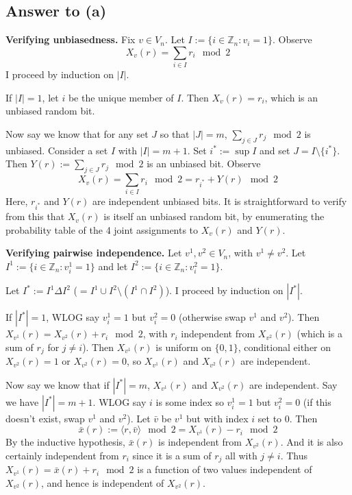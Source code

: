 \documentclass{article}
\begin{document}
\subsection*{Answer to (a)}

\textbf{Verifying unbiasedness.}
Fix $v \in V_n$.
Let $I := \{i \in \mathbb{Z}_n : v_i = 1\}$.
Observe $$X_v(r) = \sum_{i \in I} r_i \mod 2$$
\noindent I proceed by induction on $|I|$.

If $|I| = 1$, let $i$ be the unique member of $I$.
Then $X_v(r) = r_i$, which is an unbiased random bit.

Now say we know that for any set $J$ so that $|J| = m$, $\sum_{j \in J} r_j \mod 2$ is unbiased.
Consider a set $I$ with $|I| = m + 1$.
Set $i^* := \sup I$ and set $J = I \setminus \{i^*\}$.
Then $Y(r) := \sum_{j \in J} r_j \mod 2$ is an unbiased bit.
Observe $$X_v(r) = \sum_{i \in I} r_i \mod 2 = r_{i^*} + Y(r) \mod 2$$
Here, $r_{i^*}$ and $Y(r)$ are independent unbiased bits.
It is straightforward to verify from this that $X_v(r)$ is itself an unbiased random bit, by enumerating the probability table of the 4 joint assignments to $X_v(r)$ and $Y(r)$.

\smallskip
\noindent \textbf{Verifying pairwise independence.}
Let $v^1, v^2 \in V_n$, with $v^1 \neq v^2$.
Let $I^1 := \{i \in \mathbb{Z}_n : v^1_i = 1\}$ and let
$I^2 := \{i \in \mathbb{Z}_n : v^2_i = 1\}$.


Let $I^* := I^1 \Delta I^2$ ($= I^1 \cup I^2 \setminus (I^1 \cap I^2)$).
I proceed by induction on $|I^*|$.

If $|I^*| = 1$, WLOG say $v^1_i = 1$ but $v^2_i = 0$ (otherwise swap $v^1$ and $v^2$).
Then $X_{v^1}(r) = X_{v^2}(r) + r_i \mod 2$, with $r_i$ independent from $X_{v^2}(r)$ (which is a sum of $r_j$ for $j \neq i$).
Then $X_{v^1}(r)$ is uniform on $\{0, 1\}$, conditional either on $X_{v^2}(r) = 1$ or $X_{v^2}(r) = 0$,
so $X_{v^1}(r)$ and $X_{v^2}(r)$ are independent.

Now say we know that if $|I^*| = m$, $X_{v^1}(r)$ and $X_{v^2}(r)$ are independent.
Say we have $|I^*| = m + 1$.
WLOG say $i$ is some index so $v^1_i = 1$ but $v^2_i = 0$ (if this doesn't exist, swap $v^1$ and $v^2$).
Let $\bar{v}$ be $v^1$ but with index $i$ set to 0.
Then $$\bar{x}(r) := \langle r, \bar{v} \rangle \mod 2 = X_{v^1}(r) - r_i \mod 2$$
By the inductive hypothesis, $\bar{x}(r)$ is independent from $X_{v^2}(r)$.
And it is also certainly independent from $r_i$ since it is a sum of $r_j$ all with $j \neq i$.
Thus $X_{v^1}(r) = \bar{x}(r) + r_i \mod 2$ is a function of two values independent of $X_{v^2}(r)$, and hence is independent of $X_{v^2}(r)$.
\end{document}

